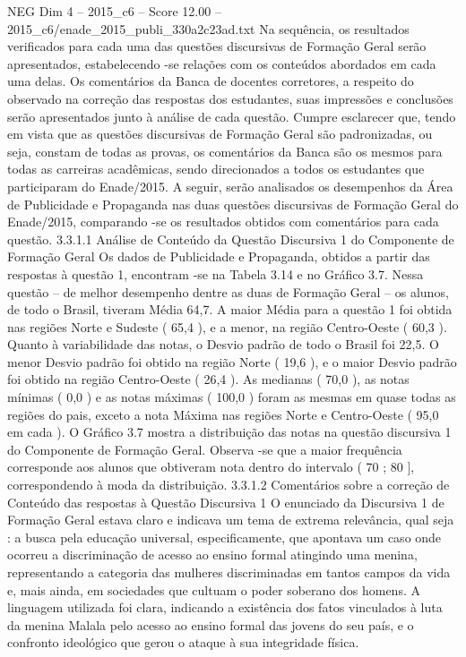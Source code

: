 \begin{textsample}{NEG Dim 4 – 2015\_c6 – Score 12.00 – 2015\_c6/enade\_2015\_publi\_330a2c23ad.txt}
Na sequência, os resultados verificados para cada uma das questões discursivas de Formação Geral serão apresentados, estabelecendo -se relações com os conteúdos abordados em cada uma delas.
Os comentários da Banca de docentes corretores, a respeito do observado na correção das respostas dos estudantes, suas impressões e conclusões serão apresentados junto à análise de cada questão.
Cumpre esclarecer que, tendo em vista que as questões discursivas de Formação Geral são padronizadas, ou seja, constam de todas as provas, os comentários da Banca são os mesmos para todas as carreiras acadêmicas, sendo direcionados a todos os estudantes que participaram do Enade/2015.
A seguir, serão analisados os desempenhos da Área de Publicidade e Propaganda nas duas questões discursivas de Formação Geral do Enade/2015, comparando -se os resultados obtidos com comentários para cada questão. 3.3.1.1 Análise de Conteúdo da Questão Discursiva 1 do Componente de Formação Geral Os dados de Publicidade e Propaganda, obtidos a partir das respostas à questão 1, encontram -se na Tabela 3.14 e no Gráfico 3.7.
Nessa questão – de melhor desempenho dentre as duas de Formação Geral – os alunos, de todo o Brasil, tiveram Média 64,7.
A maior Média para a questão 1 foi obtida nas regiões Norte e Sudeste ( 65,4 ), e a menor, na região Centro-Oeste ( 60,3 ).
Quanto à variabilidade das notas, o Desvio padrão de todo o Brasil foi 22,5.
O menor Desvio padrão foi obtido na região Norte ( 19,6 ), e o maior Desvio padrão foi obtido na região Centro-Oeste ( 26,4 ).
As medianas ( 70,0 ), as notas mínimas ( 0,0 ) e as notas máximas ( 100,0 ) foram as mesmas em quase todas as regiões do pais, exceto a nota Máxima nas regiões Norte e Centro-Oeste ( 95,0 em cada ).
O Gráfico 3.7 mostra a distribuição das notas na questão discursiva 1 do Componente de Formação Geral.
Observa -se que a maior frequência corresponde aos alunos que obtiveram nota dentro do intervalo ( 70 ; 80 ], correspondendo à moda da distribuição. 3.3.1.2 Comentários sobre a correção de Conteúdo das respostas à Questão Discursiva 1 O enunciado da Discursiva 1 de Formação Geral estava claro e indicava um tema de extrema relevância, qual seja : a busca pela educação universal, especificamente, que apontava um caso onde ocorreu a discriminação de acesso ao ensino formal atingindo uma menina, representando a categoria das mulheres discriminadas em tantos campos da vida e, mais ainda, em sociedades que cultuam o poder soberano dos homens.
A linguagem utilizada foi clara, indicando a existência dos fatos vinculados à luta da menina Malala pelo acesso ao ensino formal das jovens do seu país, e o confronto ideológico que gerou o ataque à sua integridade física.

\end{textsample}
